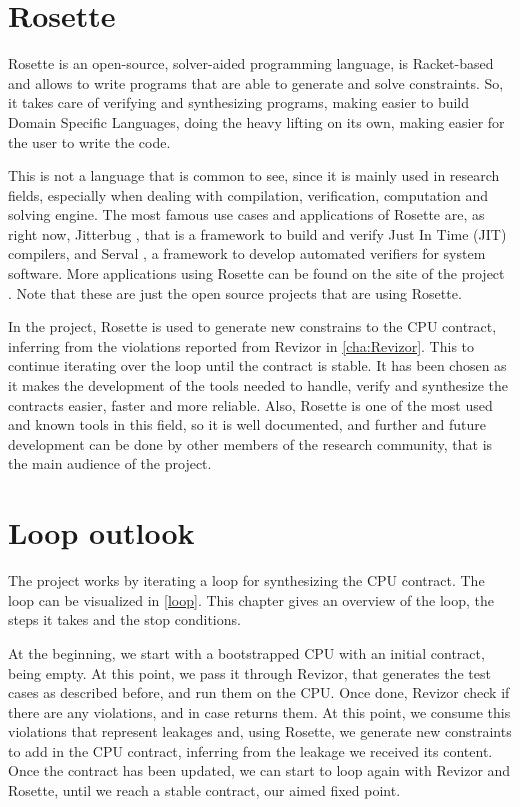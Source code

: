 \section{Rosette}
\label{cha:Rosette} Rosette \cite{ros} is an open-source, solver-aided programming
language, is Racket-based and allows to write programs that are able to generate
and solve constraints. So, it takes care of verifying and synthesizing programs,
making easier to build Domain Specific Languages, doing the heavy lifting on its
own, making easier for the user to write the code.

This is not a language that is common to see, since it is mainly used in
research fields, especially when dealing with compilation, verification, computation
and solving engine. The most famous use cases and applications of Rosette are, as
right now, Jitterbug \cite{jit}, that is a framework to build and verify Just In
Time (JIT) compilers, and Serval \cite{ser}, a framework to develop automated verifiers
for system software. More applications using Rosette can be found on the site of
the project \cite{ros}. Note that these are just the open source projects that are
using Rosette.

In the project, Rosette is used to generate new constrains to the CPU contract, inferring
from the violations reported from Revizor in \cref{cha:Revizor}. This to
continue iterating over the loop until the contract is stable. It has been chosen
as it makes the development of the tools needed to handle, verify and synthesize
the contracts easier, faster and more reliable. Also, Rosette is one of the most
used and known tools in this field, so it is well documented, and further and future
development can be done by other members of the research community, that is the
main audience of the project.

\section{Loop outlook}
\label{cha: Loop outlook} The project works by iterating a loop for synthesizing
the CPU contract. The loop can be visualized in \cref{loop}. This chapter gives
an overview of the loop, the steps it takes and the stop conditions.

At the beginning, we start with a bootstrapped CPU with an initial contract, being
empty. At this point, we pass it through Revizor, that generates the test cases
as described before, and run them on the CPU. Once done, Revizor check if there are
any violations, and in case returns them. At this point, we consume this
violations that represent leakages and, using Rosette, we generate new
constraints to add in the CPU contract, inferring from the leakage we received its
content. Once the contract has been updated, we can start to loop again with Revizor
and Rosette, until we reach a stable contract, our aimed fixed point.

